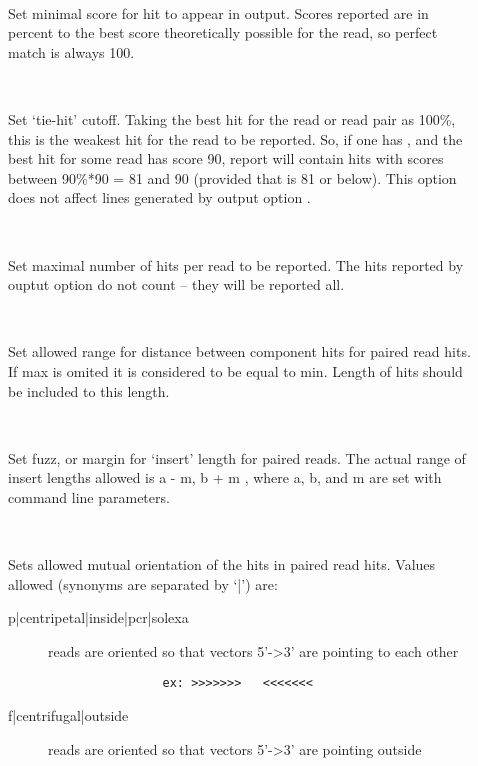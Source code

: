 \documentclass[english]{article}
\begin{document}
\begin{description}
\item[~~]
				Set minimal score for hit to appear in output.  Scores reported are 
                in percent to the best score theoretically possible for the read, so 
                perfect match is always 100.
\item[~~]
				Set `tie-hit' cutoff. Taking the best hit for the read or read
                pair as 100\%, this is the weakest hit for the read to be
                reported. So, if one has , and the best hit for some read
                has score 90, report will contain hits with scores between
                90\%*90 = 81 and 90 (provided that  is 81 or below). This
                option does not affect lines generated by output option .
\item[~~]
				Set maximal number of hits per read to be reported. The hits
                reported by ouptut option  do not count -- they will be
                reported all.
\item[~~]    
				Set allowed range for distance between component hits for 
                paired read hits. If max is omited it is considered to be equal 
                to min. Length of hits should be included to this length. 
\item[~~]
				Set fuzz, or margin for `insert' length for paired reads. The
                actual range of insert lengths allowed is \Lbr a - m, b + m \Rbr,
                where a, b, and m are set with   command line parameters.
\item[~~]
				Sets allowed mutual orientation of the hits in paired read hits. 
                Values allowed (synonyms are separated by `|') are:
	\begin{description}
	\item[p|centripetal|inside|pcr|solexa]
				reads are oriented so that vectors 5'->3' are pointing to each other
	\begin{verbatim}
                ex: >>>>>>>   <<<<<<<
	\end{verbatim}
	\item[f|centrifugal|outside]
				reads are oriented so that vectors 5'->3' are pointing outside

\end{description}
\end{description}
\end{document}
